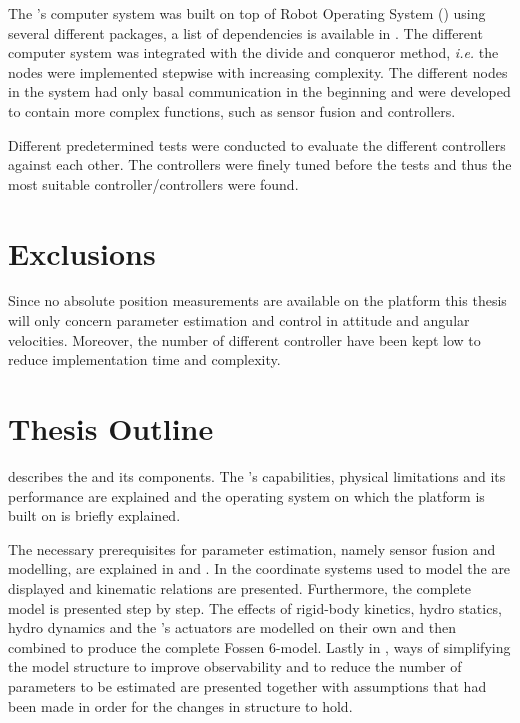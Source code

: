 The \abbrROV's computer system was built on top of Robot Operating System (\abbrROS) using several different packages, a list of dependencies is available in . The different computer system was integrated with the divide and conqueror method, \textit{i.e.} the nodes were implemented stepwise with increasing complexity. The different nodes in the system had only basal communication in the beginning and were developed to contain more complex functions, such as sensor fusion and controllers. 

Different predetermined tests were conducted to evaluate the different controllers against each other. The controllers were finely tuned before the tests and thus the most suitable controller/controllers were found.


\section{Exclusions}
Since no absolute position measurements are available on the \abbrROV platform this thesis will only concern parameter estimation and control in attitude and angular velocities. Moreover, the number of different controller have been kept low to reduce implementation time and complexity.
\section{Thesis Outline}
 describes the \abbrROV and its components. The \abbrROV's capabilities, physical limitations and its performance are explained and the operating system on which the \abbrROV platform is built on is briefly explained.

The necessary prerequisites for parameter estimation, namely sensor fusion and modelling, are explained in  and . In  the coordinate systems used to model the \abbrROV are displayed and kinematic relations are presented. Furthermore, the complete \abbrROV model is presented step by step. The effects of rigid-body kinetics, hydro statics, hydro dynamics and the \abbrROV's actuators are modelled on their own and then combined to produce the complete Fossen 6-\abbrDOF model. 
Lastly in , ways of simplifying the model structure to improve observability and to reduce the number of parameters to be estimated are presented together with assumptions that had been made in order for the changes in structure to hold. 

